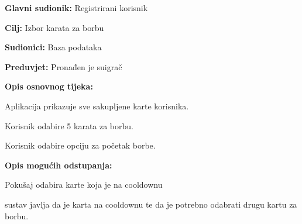 \noindent {}
\begin{packed_item}
	
	\item \textbf{Glavni sudionik: }Registrirani korisnik
	\item  \textbf{Cilj:} Izbor karata za borbu
	\item  \textbf{Sudionici:} Baza podataka
	\item  \textbf{Preduvjet:} Pronađen je suigrač
	\item  \textbf{Opis osnovnog tijeka:}
	
	\item[] \begin{packed_enum}
		
		\item Aplikacija prikazuje sve sakupljene karte korisnika.
		\item Korisnik odabire 5 karata za borbu. 
		\item Korisnik odabire opciju za početak borbe. 
	\end{packed_enum}
	
	\item  \textbf{Opis mogućih odstupanja:}
	
	\item[] \begin{packed_item}
		
		\item[2.a] Pokušaj odabira karte koja je na cooldownu
		\item[] \begin{packed_enum}
			
			\item  sustav javlja da je karta na cooldownu te da je potrebno odabrati drugu kartu za borbu.
			
		\end{packed_enum}
		
	\end{packed_item}
\end{packed_item}

